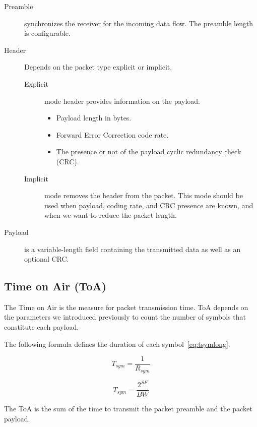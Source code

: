 \begin{description}
  \item[Preamble] synchronizes the receiver for the incoming data flow. The
    preamble length is configurable.
  \item[Header] Depends on the packet type explicit or implicit.
  \begin{description}
    \item[Explicit] mode header provides information on the payload.
    \begin{itemize}
      \item Payload length in bytes.
      \item Forward Error Correction code rate.
      \item The presence or not of the payload cyclic redundancy check (CRC).
    \end{itemize}
    \item[Implicit] mode removes the header from the packet. This mode should be
      used when payload, coding rate, and CRC presence are known, and when we want to
      reduce the packet length.
  \end{description}
  \item[Payload] is a variable-length field containing the transmitted data as
    well as an optional CRC.
\end{description}

\subsection{Time on Air (ToA)}

The Time on Air is the measure for packet transmission time.
ToA depends on the parameters we introduced previously to count the number of
symbols that constitute each payload.

The following formula defines the duration of each symbol~\ref{eq:tsymlong}.

\begin{equation}
  \label{eq:tsymlong}
  T_{sym} = \frac{1}{R_{sym}}
\end{equation}

\begin{equation}
  \label{eq:tsym}
  T_{sym} = \frac{2^{SF}}{BW}
\end{equation}

The ToA is the sum of the time to transmit the packet preamble and the packet
payload.

